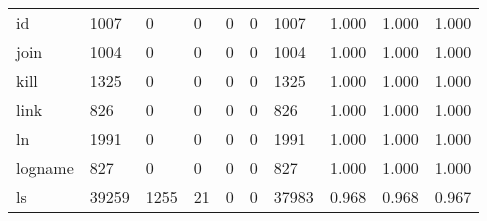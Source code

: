 \begin{longtable}{lp{1.3cm}p{1.3cm}p{1.3cm}p{1.3cm}p{1.3cm}p{1.3cm}p{1.3cm}p{1.3cm}p{1.3cm}}
id        &                   1007 &                                  0 &                                 0 &                                0 &                                 0 &                            1007 &                                   1.000 &                                  1.000 &                                1.000 \\
join      &                   1004 &                                  0 &                                 0 &                                0 &                                 0 &                            1004 &                                   1.000 &                                  1.000 &                                1.000 \\
kill      &                   1325 &                                  0 &                                 0 &                                0 &                                 0 &                            1325 &                                   1.000 &                                  1.000 &                                1.000 \\
link      &                    826 &                                  0 &                                 0 &                                0 &                                 0 &                             826 &                                   1.000 &                                  1.000 &                                1.000 \\
ln        &                   1991 &                                  0 &                                 0 &                                0 &                                 0 &                            1991 &                                   1.000 &                                  1.000 &                                1.000 \\
logname   &                    827 &                                  0 &                                 0 &                                0 &                                 0 &                             827 &                                   1.000 &                                  1.000 &                                1.000 \\
ls        &                  39259 &                               1255 &                                21 &                                0 &                                 0 &                           37983 &                                   0.968 &                                  0.968 &                                0.967 \\

\end{longtable}
